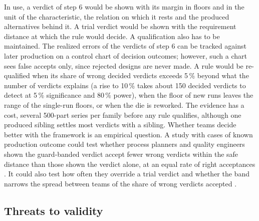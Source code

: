 \documentclass[pdflatex,sn-basic,lineno]{sn-jnl}
\begin{document}
In use, a verdict of step 6 would be shown with its margin in floors and in the unit of the characteristic, the relation on which it rests and the produced alternatives behind it. A trial verdict would be shown with the requirement distance at which the rule would decide. A qualification also has to be maintained. The realized errors of the verdicts of step 6 can be tracked against later production on a control chart of decision outcomes; however, such a chart sees false accepts only, since rejected designs are never made. A rule would be re-qualified when its share of wrong decided verdicts exceeds 5\,\% beyond what the number of verdicts explains (a rise to 10\,\% takes about 150 decided verdicts to detect at 5\,\% significance and 80\,\% power), when the floor of new runs leaves the range of the single-run floors, or when the die is reworked. The evidence has a cost, several 500-part series per family before any rule qualifies, although one produced sibling settles most verdicts with a sibling. Whether teams decide better with the framework is an empirical question. A study with cases of known production outcome could test whether process planners and quality engineers shown the guard-banded verdict accept fewer wrong verdicts within the safe distance than those shown the verdict alone, at an equal rate of right acceptances \citep{lee2004trust}. It could also test how often they override a trial verdict and whether the band narrows the spread between teams of the share of wrong verdicts accepted \citep{zhang2021cautionary}.

\subsection{Threats to validity}
\end{document}
